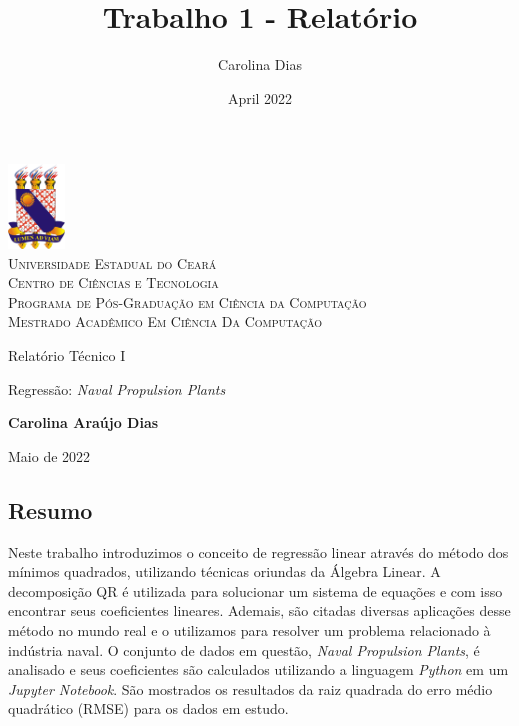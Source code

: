 \documentclass[a4paper, 12pt]{article}
\title{Trabalho 1 - Relatório}
\author{Carolina Dias}
\date{April 2022}
\theoremstyle{definition}
\theoremstyle{remark}
\begin{document}
\begin{titlepage}
	\begin{center}
	    \includegraphics[width=1.5cm]{logo-uece}\\
		\textsc{Universidade Estadual do Ceará\\Centro de Ciências e Tecnologia\\Programa de Pós-Graduação em Ciência da Computação\\Mestrado Acadêmico Em Ciência Da Computação}
		
		\vspace{5cm}
		{\small {\textsc Relatório Técnico I}}
		
		\vspace{1cm}
		
		{\huge Regressão: \textit{Naval Propulsion Plants}}
		
		\vspace{1cm}
		\textbf{Carolina Araújo Dias}
		
		\vspace{7cm}
		Maio de 2022
		
	\end{center}
\end{titlepage}

\begin{center}
    \section*{Resumo}
\end{center}

Neste trabalho introduzimos o conceito de regressão linear através do método dos mínimos quadrados, utilizando técnicas oriundas da Álgebra Linear. A decomposição QR é utilizada para solucionar um sistema de equações e com isso encontrar seus coeficientes lineares. Ademais, são citadas diversas aplicações desse método no mundo real e o utilizamos para resolver um problema relacionado à indústria naval. O conjunto de dados em questão, \textit{Naval Propulsion Plants}, é analisado e seus coeficientes são calculados utilizando a linguagem \textit{Python} em um \textit{Jupyter Notebook}. São mostrados os resultados da raiz quadrada do erro médio quadrático (RMSE) para os dados em estudo.
\end{document}
